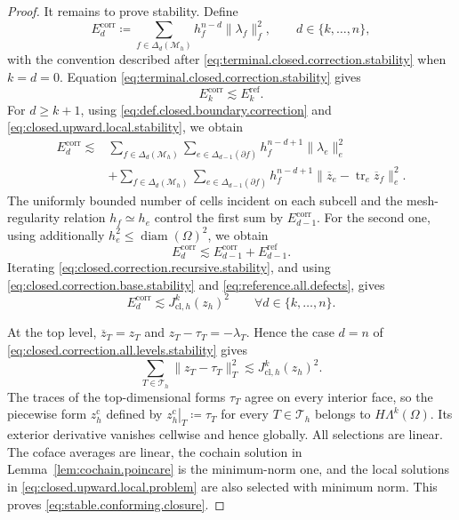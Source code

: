 \documentclass[a4paper,11pt]{article}
\theoremstyle{definition}
\newcommand{\Mh}{\mathcal{M}_h}
\newcommand{\FM}[1]{\Delta_{#1}}
\newcommand{\trc}{\operatorname{tr}}
\begin{document}
\begin{proof}
It remains to prove stability.
Define
\[
  E_d^{\mathrm{corr}}
  \coloneqq
  \sum_{f\in\FM{d}(\Mh)}
  h_f^{n-d}\|\lambda_f\|_f^2,
  \qquad
  d\in\{k,\ldots,n\},
\]
with the convention described after \eqref{eq:terminal.closed.correction.stability} when $k=d=0$.
Equation \eqref{eq:terminal.closed.correction.stability} gives
\begin{equation}
\label{eq:closed.correction.base.stability}
  E_k^{\mathrm{corr}}
  \lesssim
  E_k^{\mathrm{ref}}.
\end{equation}
For $d\geq k+1$, using \eqref{eq:def.closed.boundary.correction} and \eqref{eq:closed.upward.local.stability}, we obtain
\[
\begin{aligned}
  E_d^{\mathrm{corr}}
  \lesssim{}&
  \sum_{f\in\FM{d}(\Mh)}
  \sum_{e\in\FM{d-1}(\partial f)}
  h_f^{n-d+1}\|\lambda_e\|_e^2
  \\
  &+
  \sum_{f\in\FM{d}(\Mh)}
  \sum_{e\in\FM{d-1}(\partial f)}
  h_f^{n-d+1}
  \|
    \overline z_e-\trc_e\overline z_f
  \|_e^2.
\end{aligned}
\]
The uniformly bounded number of cells incident on each subcell and the mesh-regularity relation $h_f\simeq h_e$ control the first sum by $E_{d-1}^{\mathrm{corr}}$.
For the second one, using additionally $h_e^2\leq\operatorname{diam}(\Omega)^2$, we obtain
\begin{equation}
\label{eq:closed.correction.recursive.stability}
  E_d^{\mathrm{corr}}
  \lesssim
  E_{d-1}^{\mathrm{corr}}
  +
  E_{d-1}^{\mathrm{ref}}.
\end{equation}
Iterating \eqref{eq:closed.correction.recursive.stability}, and using \eqref{eq:closed.correction.base.stability} and \eqref{eq:reference.all.defects}, gives
\begin{equation}
\label{eq:closed.correction.all.levels.stability}
  E_d^{\mathrm{corr}}
  \lesssim
  J_{\mathrm{cl},h}^k(z_h)^2
  \qquad
  \forall d\in\{k,\ldots,n\}.
\end{equation}

At the top level, $\overline z_T=z_T$ and $z_T-\tau_T=-\lambda_T$.
Hence the case $d=n$ of \eqref{eq:closed.correction.all.levels.stability} gives
\[
  \sum_{T\in\mathcal T_h}
  \|z_T-\tau_T\|_T^2
  \lesssim
  J_{\mathrm{cl},h}^k(z_h)^2.
\]
The traces of the top-dimensional forms $\tau_T$ agree on every interior face, so the piecewise form $z_h^{\mathrm c}$ defined by $\left.z_h^{\mathrm c}\right|_T\coloneqq\tau_T$ for every $T\in\mathcal T_h$ belongs to $H\Lambda^k(\Omega)$.
Its exterior derivative vanishes cellwise and hence globally.
All selections are linear. The coface averages are linear, the cochain solution in Lemma~\ref{lem:cochain.poincare} is the minimum-norm one, and the local solutions in \eqref{eq:closed.upward.local.problem} are also selected with minimum norm.
This proves \eqref{eq:stable.conforming.closure}.
\end{proof}
\end{document}
